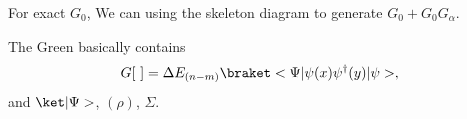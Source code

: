 \begin{enumext}
  For exact $G_0$, We can using the skeleton diagram to generate $G_0 + G_0G_\alpha$.

  The Green basically contains
  \begin{equation}
    G[~] = \Delta E_{(n-m)} \braket<\Psi|\psi(x) \psi^\dagger(y)|\psi>,
  \end{equation}
  and $\ket|\Psi>$, $(\rho)$, $\Sigma$.
\end{enumext}